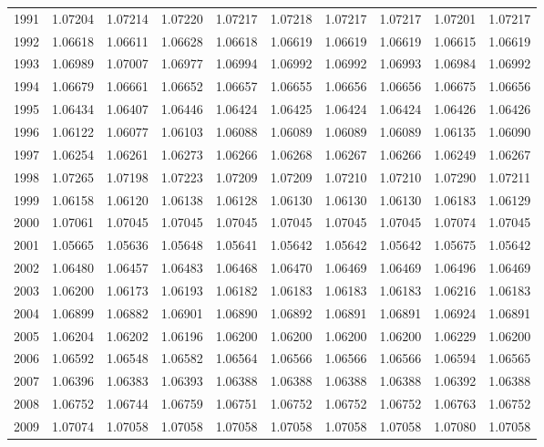 \begin{tabular}{cccccccccc}
  1991 & 1.07204 & 1.07214 & 1.07220 & 1.07217 & 1.07218 & 1.07217 & 1.07217 & 1.07201 & 1.07217 \\ 
  1992 & 1.06618 & 1.06611 & 1.06628 & 1.06618 & 1.06619 & 1.06619 & 1.06619 & 1.06615 & 1.06619 \\ 
  1993 & 1.06989 & 1.07007 & 1.06977 & 1.06994 & 1.06992 & 1.06992 & 1.06993 & 1.06984 & 1.06992 \\ 
  1994 & 1.06679 & 1.06661 & 1.06652 & 1.06657 & 1.06655 & 1.06656 & 1.06656 & 1.06675 & 1.06656 \\ 
  1995 & 1.06434 & 1.06407 & 1.06446 & 1.06424 & 1.06425 & 1.06424 & 1.06424 & 1.06426 & 1.06426 \\ 
  1996 & 1.06122 & 1.06077 & 1.06103 & 1.06088 & 1.06089 & 1.06089 & 1.06089 & 1.06135 & 1.06090 \\ 
  1997 & 1.06254 & 1.06261 & 1.06273 & 1.06266 & 1.06268 & 1.06267 & 1.06266 & 1.06249 & 1.06267 \\ 
  1998 & 1.07265 & 1.07198 & 1.07223 & 1.07209 & 1.07209 & 1.07210 & 1.07210 & 1.07290 & 1.07211 \\ 
  1999 & 1.06158 & 1.06120 & 1.06138 & 1.06128 & 1.06130 & 1.06130 & 1.06130 & 1.06183 & 1.06129 \\ 
  2000 & 1.07061 & 1.07045 & 1.07045 & 1.07045 & 1.07045 & 1.07045 & 1.07045 & 1.07074 & 1.07045 \\ 
  2001 & 1.05665 & 1.05636 & 1.05648 & 1.05641 & 1.05642 & 1.05642 & 1.05642 & 1.05675 & 1.05642 \\ 
  2002 & 1.06480 & 1.06457 & 1.06483 & 1.06468 & 1.06470 & 1.06469 & 1.06469 & 1.06496 & 1.06469 \\ 
  2003 & 1.06200 & 1.06173 & 1.06193 & 1.06182 & 1.06183 & 1.06183 & 1.06183 & 1.06216 & 1.06183 \\ 
  2004 & 1.06899 & 1.06882 & 1.06901 & 1.06890 & 1.06892 & 1.06891 & 1.06891 & 1.06924 & 1.06891 \\ 
  2005 & 1.06204 & 1.06202 & 1.06196 & 1.06200 & 1.06200 & 1.06200 & 1.06200 & 1.06229 & 1.06200 \\ 
  2006 & 1.06592 & 1.06548 & 1.06582 & 1.06564 & 1.06566 & 1.06566 & 1.06566 & 1.06594 & 1.06565 \\ 
  2007 & 1.06396 & 1.06383 & 1.06393 & 1.06388 & 1.06388 & 1.06388 & 1.06388 & 1.06392 & 1.06388 \\ 
  2008 & 1.06752 & 1.06744 & 1.06759 & 1.06751 & 1.06752 & 1.06752 & 1.06752 & 1.06763 & 1.06752 \\ 
  2009 & 1.07074 & 1.07058 & 1.07058 & 1.07058 & 1.07058 & 1.07058 & 1.07058 & 1.07080 & 1.07058 \\ 
   \hline
\end{tabular}
